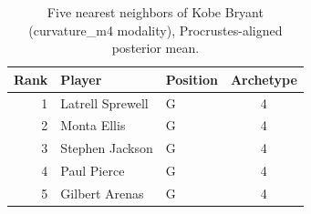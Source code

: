 \begin{table}[htbp]
  \centering\small
  \begin{tabular}{rllc}
    \toprule
    Rank & Player & Position & Archetype \\
    \midrule
    1 & Latrell Sprewell & G & 4 \\
    2 & Monta Ellis & G & 4 \\
    3 & Stephen Jackson & G & 4 \\
    4 & Paul Pierce & G & 4 \\
    5 & Gilbert Arenas & G & 4 \\
    \bottomrule
  \end{tabular}
  \caption{Five nearest neighbors of Kobe Bryant (curvature_m4 modality), Procrustes-aligned posterior mean.}
  \label{tab:Kobe_Bryant_neighbors_curvature_m4}
\end{table}

